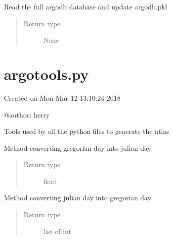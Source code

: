 \documentclass[letterpaper,10pt,english]{sphinxmanual}
\begin{document}

\begin{fulllineitems}
\label{\detokenize{pargopy:pargopy.argodb.update_wmodic}}
Read the full argodb database and update argodb.pkl
\begin{quote}\begin{description}
\item[{Return type}] \leavevmode
None

\end{description}\end{quote}

\end{fulllineitems}



\section{argotools.py}
\label{\detokenize{pargopy:argotools-py}}\label{\detokenize{pargopy:module-pargopy.argotools}}
Created on Mon Mar 12 13:10:24 2018

@author: herry

Tools used by all the python files to generate the atlas

\begin{fulllineitems}
\label{\detokenize{pargopy:pargopy.argotools.conversion_gregd_juld}}
Method converting gregorian day into julian day
\begin{quote}\begin{description}
\item[{Return type}] \leavevmode
float

\end{description}\end{quote}

\end{fulllineitems}


\begin{fulllineitems}
\label{\detokenize{pargopy:pargopy.argotools.conversion_juld_gregd}}
Method converting julian day into gregorian day
\begin{quote}\begin{description}
\item[{Return type}] \leavevmode
list of int

\end{description}\end{quote}

\end{fulllineitems}
\end{document}
